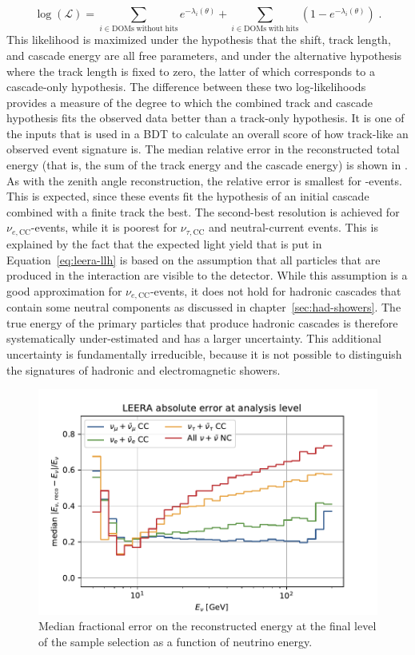 \begin{equation}
    \log(\mathcal{L}) = \sum_{i\in\mathrm{DOMs\;without\;hits}} e^{-\lambda_i(\theta)} + \sum_{i\in\mathrm{DOMs\;with\;hits}} (1 - e^{-\lambda_i(\theta)})\;.
    \label{eq:leera-llh}
\end{equation}
This likelihood is maximized under the hypothesis that the shift, track length, and cascade energy are all free parameters, and under the alternative hypothesis where the track length is fixed to zero, the latter of which corresponds to a cascade-only hypothesis. The difference between these two log-likelihoods provides a measure of the degree to which the combined track and cascade hypothesis fits the observed data better than a track-only hypothesis. It is one of the inputs that is used in a BDT to calculate an overall score of how track-like an observed event signature is. The median relative error in the reconstructed total energy (that is, the sum of the track energy and the cascade energy) is shown in . As with the zenith angle reconstruction, the relative error is smallest for \numucc-events. This is expected, since these events fit the hypothesis of an initial cascade combined with a finite track the best. The second-best resolution is achieved for $\nu_{e,\mathrm{CC}}$-events, while it is poorest for $\nu_{\tau,\mathrm{CC}}$ and neutral-current events. This is explained by the fact that the expected light yield that is put in Equation~\ref{eq:leera-llh} is based on the assumption that all particles that are produced in the interaction are visible to the detector. While this assumption is a good approximation for $\nu_{e,\mathrm{CC}}$-events, it does not hold for hadronic cascades that contain some neutral components as discussed in chapter~\ref{sec:had-showers}. The true energy of the primary particles that produce hadronic cascades is therefore systematically under-estimated and has a larger uncertainty. This additional uncertainty is fundamentally irreducible, because it is not possible to distinguish the signatures of hadronic and electromagnetic showers.

\begin{figure}
    \centering
    \includegraphics[width=0.8\linewidth]{figures/icecube/reconstruction/leera/leera_absolute_error_final.pdf}
    \caption{Median fractional error on the reconstructed energy at the final level of the sample selection as a function of neutrino energy.}
    \label{fig:leera-resolution}
\end{figure}

